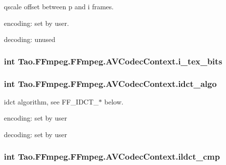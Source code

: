 \label{struct_tao_1_1_f_fmpeg_1_1_f_fmpeg_1_1_a_v_codec_context_acb11ab2c791025ac9361781957c3bd78}
qscale offset between p and i frames.
\begin{DoxyItemize}
\item encoding: set by user.
\item decoding: unused 
\end{DoxyItemize}\hypertarget{struct_tao_1_1_f_fmpeg_1_1_f_fmpeg_1_1_a_v_codec_context_a719c9df466ee6d878df69979e351301f}{
\subsubsection[{i\_\-tex\_\-bits}]{\setlength{\rightskip}{0pt plus 5cm}int {\bf Tao.FFmpeg.FFmpeg.AVCodecContext.i\_\-tex\_\-bits}}}
\label{struct_tao_1_1_f_fmpeg_1_1_f_fmpeg_1_1_a_v_codec_context_a719c9df466ee6d878df69979e351301f}
\hypertarget{struct_tao_1_1_f_fmpeg_1_1_f_fmpeg_1_1_a_v_codec_context_ae786ce9ce0b202fda584e087b7e054e1}{
\subsubsection[{idct\_\-algo}]{\setlength{\rightskip}{0pt plus 5cm}int {\bf Tao.FFmpeg.FFmpeg.AVCodecContext.idct\_\-algo}}}
\label{struct_tao_1_1_f_fmpeg_1_1_f_fmpeg_1_1_a_v_codec_context_ae786ce9ce0b202fda584e087b7e054e1}
idct algorithm, see FF\_\-IDCT\_\-$\ast$ below.
\begin{DoxyItemize}
\item encoding: set by user
\item decoding: set by user 
\end{DoxyItemize}\hypertarget{struct_tao_1_1_f_fmpeg_1_1_f_fmpeg_1_1_a_v_codec_context_aa370704b3271e840ba642cd2121670d5}{
\subsubsection[{ildct\_\-cmp}]{\setlength{\rightskip}{0pt plus 5cm}int {\bf Tao.FFmpeg.FFmpeg.AVCodecContext.ildct\_\-cmp}}}
